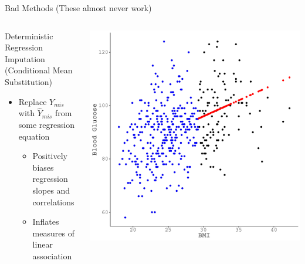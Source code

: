 \documentclass{beamer}\usepackage[]{graphicx}\usepackage[]{color}
\makeatletter
\def\maxwidth{ %
  \ifdim\Gin@nat@width>\linewidth
    \linewidth
  \else
    \Gin@nat@width
  \fi
}
\newenvironment{knitrout}{}{} %
\makeatother
\begin{document}

\begin{frame}{Bad Methods (These almost never work)} 

  \begin{columns}
    \begin{column}{0.5\textwidth}
      
      Deterministic Regression Imputation\\
      (Conditional Mean Substitution)
      \begin{itemize}
      \item Replace $Y_{mis}$ with $\widehat{Y}_{mis}$ from some regression 
        equation
        \begin{itemize}
        \item Positively biases regression slopes and correlations
        \item Inflates measures of linear association
        \end{itemize}
      \end{itemize}
      
    \end{column}
    \begin{column}{0.5\textwidth}
      
\begin{knitrout}\footnotesize
{}\color{fgcolor}

{\centering \includegraphics[width=\maxwidth]{figure/intro-unnamed-chunk-23-1} 

}


\end{knitrout}

\end{column}
\end{columns}

\end{frame}
\end{document}
